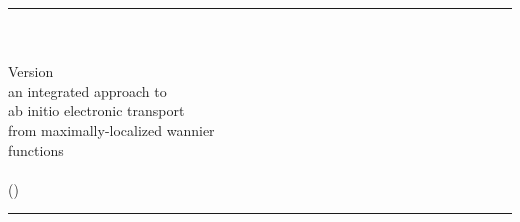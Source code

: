 
\thispagestyle{empty}

\vspace*{1.4in}

\begin{centering}
  \rule{6.5in}{0.04in}                            \\  \vspace{0.25in}
  {\Huge \WANT\ \UGTITLE  }                       \\  \vspace{0.25in}
  {\Large Version \WANTVERSION}                   \\  \vspace{1.10in}
  {\Large {\sc an integrated approach to}}        \\  \vspace{0.10in}
  {\Huge  {\sc ab initio electronic transport}}   \\  \vspace{0.10in}
  {\Huge  {\sc from maximally-localized wannier}} \\  \vspace{0.10in}
  {\Huge  {\sc  functions}}                       \\  \vspace{1.10in}
  {\Large \WANTDATE}                              \\  \vspace{0.10in}
  {\Large (\WANTURL)}                             \\  \vspace{0.25in}
  \rule{6.5in}{0.04in}                            \\  \vspace{0.25in}
\end{centering}
  \noindent \UGDESC

